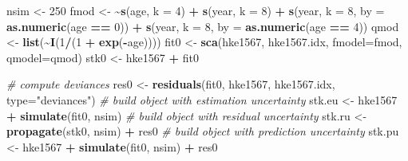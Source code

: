 \documentclass[
]{book}
\newenvironment{Shaded}{\begin{snugshade}}{\end{snugshade}}
\newcommand{\AttributeTok}[1]{\textcolor[rgb]{0.13,0.29,0.53}{#1}}
\newcommand{\CommentTok}[1]{\textcolor[rgb]{0.56,0.35,0.01}{\textit{#1}}}
\newcommand{\DecValTok}[1]{\textcolor[rgb]{0.00,0.00,0.81}{#1}}
\newcommand{\ErrorTok}[1]{\textcolor[rgb]{0.64,0.00,0.00}{\textbf{#1}}}
\newcommand{\FunctionTok}[1]{\textcolor[rgb]{0.13,0.29,0.53}{\textbf{#1}}}
\newcommand{\NormalTok}[1]{#1}
\newcommand{\OtherTok}[1]{\textcolor[rgb]{0.56,0.35,0.01}{#1}}
\newcommand{\SpecialCharTok}[1]{\textcolor[rgb]{0.81,0.36,0.00}{\textbf{#1}}}
\newcommand{\StringTok}[1]{\textcolor[rgb]{0.31,0.60,0.02}{#1}}
\begin{document}
\begin{Shaded}
\begin{Highlighting}[]
\NormalTok{nsim }\OtherTok{\textless{}{-}} \DecValTok{250}
\NormalTok{fmod }\OtherTok{\textless{}{-}} \ErrorTok{\textasciitilde{}}\FunctionTok{s}\NormalTok{(age, }\AttributeTok{k =} \DecValTok{4}\NormalTok{) }\SpecialCharTok{+}
    \FunctionTok{s}\NormalTok{(year, }\AttributeTok{k =} \DecValTok{8}\NormalTok{) }\SpecialCharTok{+}
    \FunctionTok{s}\NormalTok{(year, }\AttributeTok{k =} \DecValTok{8}\NormalTok{, }\AttributeTok{by =} \FunctionTok{as.numeric}\NormalTok{(age }\SpecialCharTok{==} \DecValTok{0}\NormalTok{)) }\SpecialCharTok{+}
    \FunctionTok{s}\NormalTok{(year, }\AttributeTok{k =} \DecValTok{8}\NormalTok{, }\AttributeTok{by =} \FunctionTok{as.numeric}\NormalTok{(age }\SpecialCharTok{==} \DecValTok{4}\NormalTok{))}
\NormalTok{qmod }\OtherTok{\textless{}{-}} \FunctionTok{list}\NormalTok{(}\SpecialCharTok{\textasciitilde{}}\FunctionTok{I}\NormalTok{(}\DecValTok{1}\SpecialCharTok{/}\NormalTok{(}\DecValTok{1} \SpecialCharTok{+} \FunctionTok{exp}\NormalTok{(}\SpecialCharTok{{-}}\NormalTok{age))))}
\NormalTok{fit0 }\OtherTok{\textless{}{-}} \FunctionTok{sca}\NormalTok{(hke1567, hke1567.idx, }\AttributeTok{fmodel=}\NormalTok{fmod, }\AttributeTok{qmodel=}\NormalTok{qmod)}
\NormalTok{stk0 }\OtherTok{\textless{}{-}}\NormalTok{ hke1567 }\SpecialCharTok{+}\NormalTok{ fit0}

\CommentTok{\# compute deviances}
\NormalTok{res0 }\OtherTok{\textless{}{-}} \FunctionTok{residuals}\NormalTok{(fit0, hke1567, hke1567.idx, }\AttributeTok{type=}\StringTok{"deviances"}\NormalTok{)}
\CommentTok{\# build object with estimation uncertainty}
\NormalTok{stk.eu }\OtherTok{\textless{}{-}}\NormalTok{ hke1567 }\SpecialCharTok{+} \FunctionTok{simulate}\NormalTok{(fit0, nsim)}
\CommentTok{\# build object with residual uncertainty}
\NormalTok{stk.ru }\OtherTok{\textless{}{-}} \FunctionTok{propagate}\NormalTok{(stk0, nsim) }\SpecialCharTok{+}\NormalTok{ res0}
\CommentTok{\# build object with prediction uncertainty}
\NormalTok{stk.pu }\OtherTok{\textless{}{-}}\NormalTok{ hke1567 }\SpecialCharTok{+} \FunctionTok{simulate}\NormalTok{(fit0, nsim) }\SpecialCharTok{+}\NormalTok{ res0}
\end{Highlighting}
\end{Shaded}
\end{document}

